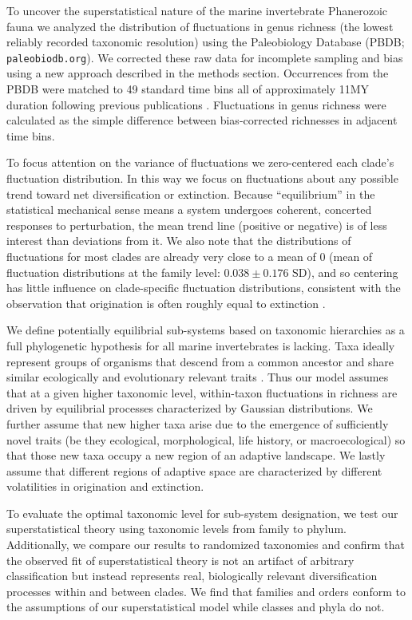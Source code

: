 \documentclass[12pt]{article}
\let\citep=\cite
\begin{document}
To uncover the superstatistical nature of the marine invertebrate
Phanerozoic fauna we analyzed the distribution of fluctuations in
genus richness (the lowest reliably recorded taxonomic resolution)
using the Paleobiology Database (PBDB; {\tt paleobiodb.org}). We
corrected these raw data for incomplete sampling and bias using a new
approach described in the methods section. Occurrences from the PBDB
were matched to 49 standard time bins all of approximately 11MY
duration following previous publications \citep{alroy08,
  alroy2010}. Fluctuations in genus richness were calculated as the
simple difference between bias-corrected richnesses in adjacent
time bins.

To focus attention on the variance of fluctuations we zero-centered
each clade's fluctuation distribution. In this way we focus on
fluctuations about any possible trend toward net diversification or
extinction. Because ``equilibrium'' in the statistical mechanical
sense means a system undergoes coherent, concerted responses to
perturbation, the mean trend line (positive or negative) is of less
interest than deviations from it. We also note that the distributions
of fluctuations for most clades are already very close to a mean of 0
(mean of fluctuation distributions at the family level:
$0.038 \pm 0.176 \text{ SD}$), and so centering has little influence
on clade-specific fluctuation distributions, consistent with the
observation that origination is often roughly equal to extinction
\citep{foote2010Chapter}.

We define potentially equilibrial sub-systems based on taxonomic
hierarchies as a full phylogenetic hypothesis for all marine
invertebrates is lacking.  Taxa ideally represent groups of organisms
that descend from a common ancestor and share similar ecologically and
evolutionary relevant traits \citep{mayr1965systZool, erwin2007,
  ezard2016}. Thus our model assumes that at a given higher taxonomic
level, within-taxon fluctuations in richness are driven by
equilibrial processes characterized by Gaussian distributions. We
further assume that new higher taxa arise due to the emergence of
sufficiently novel traits (be they ecological, morphological, life
history, or macroecological) so that those new taxa occupy a new
region of an adaptive landscape. We lastly assume that different
regions of adaptive space are characterized by different volatilities
in origination and extinction.

To evaluate the optimal taxonomic level for sub-system designation, we
test our superstatistical theory using taxonomic levels from family to
phylum. Additionally, we compare our results to randomized taxonomies
and confirm that the observed fit of superstatistical theory is not an
artifact of arbitrary classification but instead represents real,
biologically relevant diversification processes within and between
clades. We find that families and orders conform to the assumptions of
our superstatistical model while classes and phyla do not.
\end{document}
